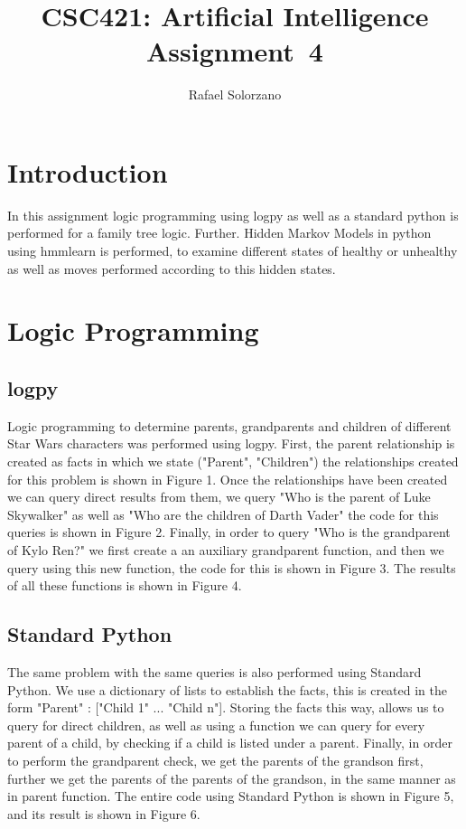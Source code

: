 \documentclass[12pt, letter]{article}
\newcommand{\courseName}{CSC421: Artificial Intelligence}
\newcommand{\assignName}{Assignment~4}
\begin{document}
\pagestyle{titlesec_assignment}

\title{\courseName\\\assignName}
\author{Rafael Solorzano}
\maketitle

\section{Introduction}

In this assignment logic programming using logpy as well as a standard python is performed for a family tree logic. Further. Hidden Markov Models in python using hmmlearn is performed, to examine different states of healthy or unhealthy as well as moves performed according to this hidden states. 

\section{Logic Programming}

\subsection{logpy}

Logic programming to determine parents, grandparents and children of different Star Wars characters was performed using logpy. First, the parent relationship is created as facts in which we state ("Parent", "Children") the relationships created for this problem is shown in Figure 1. Once the relationships have been created we can query direct results from them, we query "Who is the parent of Luke Skywalker" as well as "Who are the children of Darth Vader" the code for this queries is shown in Figure 2. Finally, in order to query "Who is the grandparent of Kylo Ren?" we first create a an auxiliary grandparent function, and then we query using this new function, the code for this is shown in Figure 3. The results of all these functions is shown in Figure 4.

\subsection{Standard Python}

The same problem with the same queries is also performed using Standard Python. We use a dictionary of lists to establish the facts, this is created in the form "Parent" : ["Child 1" ... "Child n"]. Storing the facts this way, allows us to query for direct children, as well as using a function we can query for every parent of a child, by checking if a child is listed under a parent. Finally, in order to perform the grandparent check, we get the parents of the grandson first, further we get the parents of the parents of the grandson, in the same manner as in parent function. The entire code using Standard Python is shown in Figure 5, and its result is shown in Figure 6. 
\end{document}
